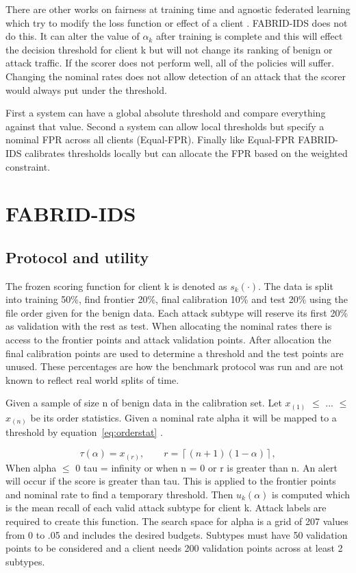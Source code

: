 \documentclass[pdflatex,sn-mathphys-num]{sn-jnl}
\begin{document}
There are other works on fairness at training time and agnostic federated learning which try to modify the loss function or effect of a client \cite{kairouz2021advances}. FABRID-IDS does not do this. It can alter the value of $\alpha_k$ after training is complete and this will effect the decision threshold for client k but will not change its ranking of benign or attack traffic. If the scorer does not perform well, all of the policies will suffer. Changing the nominal rates does not allow detection of an attack that the scorer would always put under the threshold.

First a system can have a global absolute threshold and compare everything against that value. Second a system can allow local thresholds but specify a nominal FPR across all clients (Equal-FPR). Finally like Equal-FPR FABRID-IDS calibrates thresholds locally but can allocate the FPR based on the weighted constraint.

\section{FABRID-IDS}\label{sec:method}
\subsection{Protocol and utility}
The frozen scoring function for client k is denoted as $s_k(\cdot)$. The data is split into training 50\%, find frontier 20\%, final calibration 10\% and test 20\% using the file order given for the benign data. Each attack subtype will reserve its first 20\% as validation with the rest as test. When allocating the nominal rates there is access to the frontier points and attack validation points. After allocation the final calibration points are used to determine a threshold and the test points are unused. These percentages are how the benchmark protocol was run and are not known to reflect real world splits of time.

Given a sample of size n of benign data in the calibration set. Let $x_{(1)}$ $\leq$ ... $\leq$ $x_{(n)}$ be its order statistics. Given a nominal rate alpha it will be mapped to a threshold by equation~\ref{eq:orderstat} \cite{angelopoulos2023gentle}.

\begin{equation}
 \tau(\alpha)=x_{(r)},\qquad r=\left\lceil(n+1)(1-\alpha)\right\rceil,
 \label{eq:orderstat}
\end{equation}
When alpha $\leq$ 0 tau = infinity or when n = 0 or r is greater than n. An alert will occur if the score is greater than tau. This is applied to the frontier points and nominal rate to find a temporary threshold. Then $u_k(\alpha)$ is computed which is the mean recall of each valid attack subtype for client k. Attack labels are required to create this function. The search space for alpha is a grid of 207 values from 0 to .05 and includes the desired budgets. Subtypes must have 50 validation points to be considered and a client needs 200 validation points across at least 2 subtypes.
\end{document}
